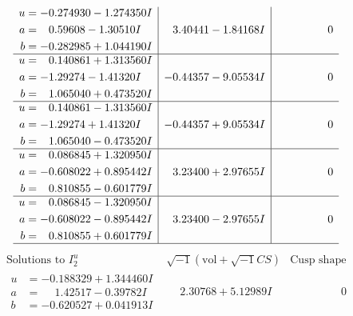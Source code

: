 \documentclass[1p]{elsarticle_modified}
\theoremstyle{definition}
\newcommand{\I}{\sqrt{-1}}
\begin{document}
$$\begin{array}{c|c|c}
\begin{aligned}
u &= -0.274930 - 1.274350 I \\
a &= \phantom{-}0.59608 - 1.30510 I \\
b &= -0.282985 + 1.044190 I\end{aligned}
 & \phantom{-}3.40441 - 1.84168 I & \phantom{-0.000000 } 0 \\ \hline\begin{aligned}
u &= \phantom{-}0.140861 + 1.313560 I \\
a &= -1.29274 - 1.41320 I \\
b &= \phantom{-}1.065040 + 0.473520 I\end{aligned}
 & -0.44357 - 9.05534 I & \phantom{-0.000000 } 0 \\ \hline\begin{aligned}
u &= \phantom{-}0.140861 - 1.313560 I \\
a &= -1.29274 + 1.41320 I \\
b &= \phantom{-}1.065040 - 0.473520 I\end{aligned}
 & -0.44357 + 9.05534 I & \phantom{-0.000000 } 0 \\ \hline\begin{aligned}
u &= \phantom{-}0.086845 + 1.320950 I \\
a &= -0.608022 + 0.895442 I \\
b &= \phantom{-}0.810855 - 0.601779 I\end{aligned}
 & \phantom{-}3.23400 + 2.97655 I & \phantom{-0.000000 } 0 \\ \hline\begin{aligned}
u &= \phantom{-}0.086845 - 1.320950 I \\
a &= -0.608022 - 0.895442 I \\
b &= \phantom{-}0.810855 + 0.601779 I\end{aligned}
 & \phantom{-}3.23400 - 2.97655 I & \phantom{-0.000000 } 0\\
 \hline 
 \end{array}$$\newpage$$\begin{array}{c|c|c}  
\text{Solutions to }I^u_{2}& \I (\text{vol} + \sqrt{-1}CS) & \text{Cusp shape}\\
 \hline 
\begin{aligned}
u &= -0.188329 + 1.344460 I \\
a &= \phantom{-}1.42517 - 0.39782 I \\
b &= -0.620527 + 0.041913 I\end{aligned}
 & \phantom{-}2.30768 + 5.12989 I & \phantom{-0.000000 } 0 \\ \hline\begin{aligned}

\end{aligned}
\end{array}$$
\end{document}
